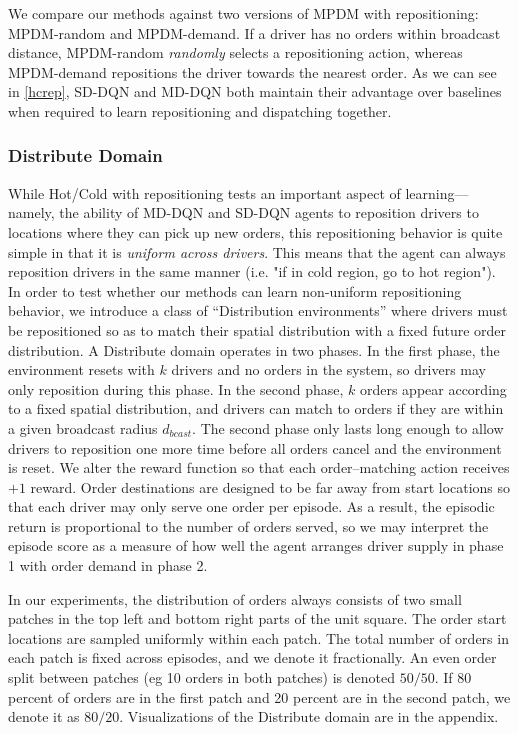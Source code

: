 We compare our methods against two versions of MPDM with repositioning: MPDM-random and MPDM-demand. If a driver has no orders within broadcast distance, MPDM-random {\em randomly} selects a repositioning action, whereas MPDM-demand repositions the driver towards the nearest order. As we can see in \cref{hcrep}, SD-DQN and MD-DQN both maintain their advantage over baselines when required to learn repositioning and dispatching together. 

\subsubsection{Distribute Domain} While Hot/Cold with repositioning tests an important aspect of learning---namely, the ability of MD-DQN and SD-DQN agents to reposition drivers to locations where they can pick up new orders, this repositioning behavior is quite simple in that it is {\em uniform across drivers}. This means that the agent can always reposition drivers in the same manner (i.e. "if in cold region, go to hot region"). In order to test whether our methods can learn non-uniform repositioning behavior, we introduce a class of ``Distribution environments'' where drivers must be repositioned so as to match their spatial distribution with a fixed future order distribution. A Distribute domain operates in two phases. In the first phase, the environment resets with $k$ drivers and no orders in the system, so drivers may only reposition during this phase. In the second phase, $k$ orders appear according to a fixed spatial distribution, and drivers can match to orders if they are within a given broadcast radius $d_{bcast}$. The second phase only lasts long enough to allow drivers to reposition one more time before all orders cancel and the environment is reset. We alter the reward function so that each order--matching action receives $+1$ reward. Order destinations are designed to be far away from start locations so that each driver may only serve one order per episode. As a result, the episodic return is proportional to the number of orders served, so we may interpret the episode score as a measure of how well the agent arranges driver supply in phase 1 with order demand in phase 2.

In our experiments, the distribution of orders always consists of two small patches in the top left and bottom right parts of the unit square. The order start locations are sampled uniformly within each patch. The total number of orders in each patch is fixed across episodes, and we denote it fractionally. An even order split between patches (eg 10 orders in both patches) is denoted $50/50$. If 80 percent of orders are in the first patch and 20 percent are in the second patch, we denote it as $80/20$. Visualizations of the Distribute domain are in the appendix.

